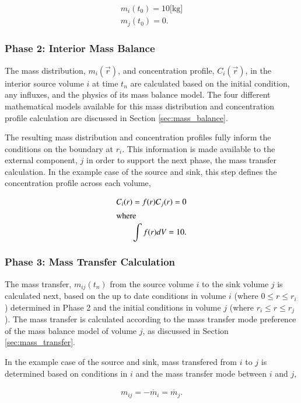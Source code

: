 \begin{align}
 m_i(t_0) = 10 \mbox{[kg]}\\
 m_j(t_0) = 0.
\end{align}

\subsubsection{Phase 2: Interior Mass Balance}

The mass distribution, $m_i(\vec{r})$, and concentration profile, 
$C_i(\vec{r})$, in the interior source volume $i$ at time $t_n$ are calculated 
based on the initial condition, any influxes, and the physics of its mass 
balance model.  The four different mathematical models available for this mass 
distribution and concentration profile calculation are discussed in Section 
\ref{sec:mass_balance}.

The resulting mass distribution and concentration profiles fully inform
the conditions on the boundary at $r_i$. This information is made available
to the external component, $j$ in order to support the next phase, the mass
transfer calculation. In the example case of the source and sink, this step 
defines the concentration profile across each volume,

\begin{align}
C_i(r) = f(r)
C_j(r) = 0\\
\intertext{where}
\int f(r)dV = 10.
\end{align}

\subsubsection{Phase 3: Mass Transfer Calculation}

The mass transfer, $m_{ij}(t_n)$ from the source volume $i$ to the sink volume 
$j$ is calculated next, based on the up to date conditions in volume $i$ (where 
$0\le r \le r_i$) determined in Phase 2 and the initial conditions in volume 
$j$ (where $r_i \le r \le r_j$). The mass transfer is calculated according to 
the mass transfer mode preference of the mass balance model of volume $j$, as 
discussed in Section \ref{sec:mass_transfer}.

In the example case of the source and sink, mass transfered from $i$ to $j$ is 
determined based on conditions in $i$ and the mass transfer mode between $i$ 
and $j$,

\begin{align}
m_{ij}= -\dot{m_i} = \dot{m_j}.
\end{align}

